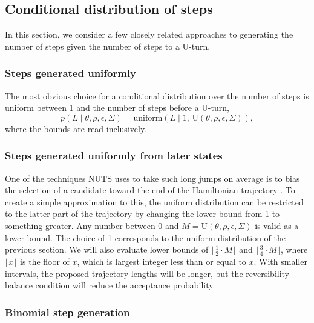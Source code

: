 \documentclass[letterpaper,11pt]{article}
\theoremstyle{plain}%
\theoremstyle{remark}
\begin{document}
\subsection{Conditional distribution of steps} 

In this section, we consider a few closely related approaches to generating the number of steps given the number of steps to a U-turn.  

\subsubsection{Steps generated uniformly}

The most obvious choice for a conditional distribution over the number of steps is uniform between 1 and the number of steps before a U-turn,
\begin{equation}
p(L \mid \theta, \rho, \epsilon, \Sigma)
= \textrm{uniform}\!\left(L \mid 1, \, \textrm{U}(\theta, \rho, \epsilon, \Sigma)\right),
\end{equation}
where the bounds are read inclusively.

\subsubsection{Steps generated uniformly from later states}

One of the techniques NUTS uses to take such long jumps on average is to bias the selection of a candidate toward the end of the Hamiltonian trajectory \cite{HoGe2014}.  To create a simple approximation to this, the uniform distribution can be restricted to the latter part of the trajectory by changing the lower bound from 1 to something greater.  Any number between 0 and $M = \textrm{U}(\theta, \rho, \epsilon, \Sigma)$ is valid as a lower bound.  The choice of 1 corresponds to the uniform distribution of the previous section.  We will also evaluate lower bounds of $\lfloor \frac{1}{2} \cdot M \rfloor$ and $\lfloor \frac{3}{4} \cdot M \rfloor$, where $\lfloor x \rfloor$ is the floor of $x$, which is largest integer less than or equal to $x$.  With smaller intervals, the proposed trajectory lengths will be longer, but the reversibility balance condition will reduce the acceptance probability.

\subsubsection{Binomial step generation}
\end{document}
